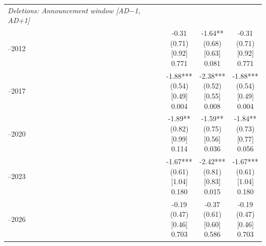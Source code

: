 \begin{threeparttable}
\begin{tabular}{@{}lccc}
\midrule
\emph{Deletions: Announcement window [AD$-$1, AD+1]} \\
\addlinespace[0.25ex]
\addlinespace[1ex]
2007–2012 & \makecell{-0.31\\(0.71)\\{}[0.92]\\{0.771}} & \makecell{-1.64**\\(0.68)\\{}[0.63]\\{0.081}} & \makecell{-0.31\\(0.71)\\{}[0.92]\\{0.771}} \\
\addlinespace[0.25ex]
\addlinespace[0.25ex]
2013–2017 & \makecell{-1.88***\\(0.54)\\{}[0.49]\\{0.004}} & \makecell{-2.38***\\(0.52)\\{}[0.55]\\{0.008}} & \makecell{-1.88***\\(0.54)\\{}[0.49]\\{0.004}} \\
\addlinespace[0.25ex]
\addlinespace[0.25ex]
2018–2020 & \makecell{-1.89**\\(0.82)\\{}[0.99]\\{0.114}} & \makecell{-1.59**\\(0.75)\\{}[0.56]\\{0.036}} & \makecell{-1.84**\\(0.73)\\{}[0.77]\\{0.056}} \\
\addlinespace[0.25ex]
\addlinespace[0.25ex]
2021–2023 & \makecell{-1.67***\\(0.61)\\{}[1.04]\\{0.180}} & \makecell{-2.42***\\(0.81)\\{}[0.83]\\{0.015}} & \makecell{-1.67***\\(0.61)\\{}[1.04]\\{0.180}} \\
\addlinespace[0.25ex]
\addlinespace[0.25ex]
2024–2026 & \makecell{-0.19\\(0.47)\\{}[0.46]\\{0.703}} & \makecell{-0.37\\(0.61)\\{}[0.60]\\{0.586}} & \makecell{-0.19\\(0.47)\\{}[0.46]\\{0.703}} \\

\end{tabular}
\end{threeparttable}
